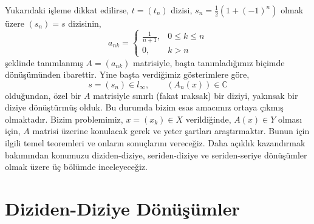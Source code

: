 Yukarıdaki işleme dikkat edilirse, $t=(t_n)$ dizisi, $s_n=\frac{1}{2}(1+(-1)^n)$ olmak üzere $(s_n)=s$ dizisinin,
$$a_{nk}=
\begin{cases}
\frac{1}{n+1}, & 0\leq k\leq n\\
0, & k>n
\end{cases}
$$
şeklinde tanımlanmış  $A=(a_{nk})$ matrisiyle,  başta tanımladığımız biçimde dönüşümünden ibarettir. Yine başta verdiğimiz gösterimlere göre,
$$
s=(s_n)\in l_\infty,\qquad (A_n(x))\in \mathbb{C}
$$
olduğundan, özel bir  $A$ matrisiyle sınırlı (fakat ıraksak) bir diziyi, yakınsak bir diziye dönüştürmüş olduk. Bu durumda bizim esas amacımız ortaya çıkmış olmaktadır. Bizim problemimiz, $x=(x_k)\in X$ verildiğinde, $A(x)\in Y$ olması için, $A$ matrisi üzerine konulacak gerek ve yeter şartları araştırmaktır. Bunun için ilgili temel teoremleri ve onların sonuçlarını vereceğiz. Daha açıklık kazandırmak bakımından konumuzu diziden-diziye, seriden-diziye ve seriden-seriye dönüşümler olmak üzere üç bölümde inceleyeceğiz.\newpage
\section{Diziden-Diziye Dönüşümler}

